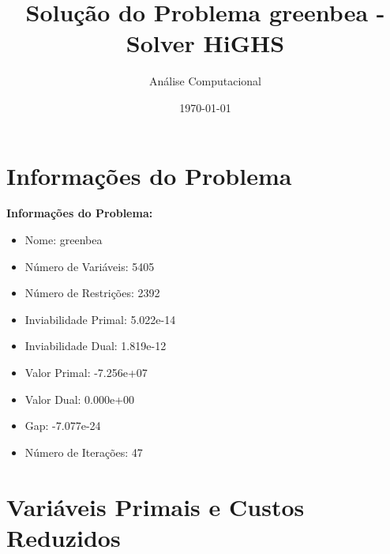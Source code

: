 \documentclass[12pt]{article}
\title{Solução do Problema greenbea - Solver HiGHS}
\author{Análise Computacional}
\date{\today}
\begin{document}
\maketitle

\section{Informações do Problema}

\textbf{Informações do Problema:}
\begin{itemize}
\item Nome: greenbea
\item Número de Variáveis: 5405
\item Número de Restrições: 2392
\item Inviabilidade Primal: 5.022e-14
\item Inviabilidade Dual: 1.819e-12
\item Valor Primal: -7.256e+07
\item Valor Dual: 0.000e+00
\item Gap: -7.077e-24
\item Número de Iterações: 47
\end{itemize}


\section{Variáveis Primais e Custos Reduzidos}
\end{document}
